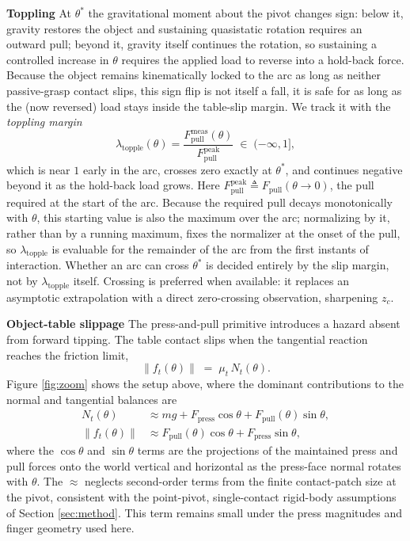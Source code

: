 \documentclass[10pt, conference]{IEEEtran}
\begin{document}
\noindent \textbf{Toppling}
At $\theta^{*}$ the gravitational moment about the pivot changes sign: below it, gravity restores the object and sustaining quasistatic rotation requires an outward pull; beyond it, gravity itself continues the rotation, so sustaining a controlled increase in $\theta$ requires the applied load to reverse into a hold-back force. Because the object remains kinematically locked to the arc as long as neither passive-grasp contact slips, this sign flip is not itself a fall, it is safe for as long as the (now reversed) load stays inside the table-slip margin. We track it with the \emph{toppling margin}
\begin{equation}
    \lambda_{\mathrm{topple}}(\theta) = \frac{F_{\mathrm{pull}}^{\mathrm{meas}}(\theta)}{F_{\mathrm{pull}}^{\mathrm{peak}}}
    \;\in\;(-\infty,1],
    \label{eq:m_topple}
\end{equation}
which is near $1$ early in the arc, crosses zero exactly at $\theta^{*}$, and continues negative beyond it as the hold-back load grows. Here $F_{\mathrm{pull}}^{\mathrm{peak}} \triangleq F_{\mathrm{pull}}(\theta \to 0)$, the pull required at the start of the arc. Because the required pull decays monotonically with $\theta$, this starting value is also the maximum over the arc; normalizing by it, rather than by a running maximum, fixes the normalizer at the onset of the pull, so $\lambda_{\mathrm{topple}}$ is evaluable for the remainder of the arc from the first instants of interaction. Whether an arc can cross $\theta^{*}$ is decided entirely by the slip margin, not by $\lambda_{\mathrm{topple}}$ itself. Crossing is preferred when available: it replaces an asymptotic extrapolation with a direct zero-crossing observation, sharpening $z_c$.

\noindent \textbf{Object-table slippage}
The press-and-pull primitive introduces a hazard absent from forward tipping. The table contact slips when the tangential reaction reaches the friction limit,
\begin{equation}
    \lVert f_t(\theta)\rVert \;=\; \mu_t\, N_t(\theta).
    \label{eq:slip_condition}
\end{equation}
Figure \ref{fig:zoom} shows the setup above, where the dominant contributions to the normal and tangential balances are
\begin{align}
    N_t(\theta) &\approx mg + F_{\mathrm{press}}\cos\theta + F_{\mathrm{pull}}(\theta)\sin\theta, \label{eq:Nt}\\
    \lVert f_t(\theta)\rVert &\approx F_{\mathrm{pull}}(\theta)\cos\theta + F_{\mathrm{press}}\sin\theta,
    \label{eq:ft}
\end{align}
where the $\cos\theta$ and $\sin\theta$ terms are the projections of the maintained press and pull forces onto the world vertical and horizontal as the press-face normal rotates with $\theta$. The $\approx$ neglects second-order terms from the finite contact-patch size at the pivot, consistent with the point-pivot, single-contact rigid-body assumptions of Section \ref{sec:method}. This term remains small under the press magnitudes and finger geometry used here.
\end{document}

